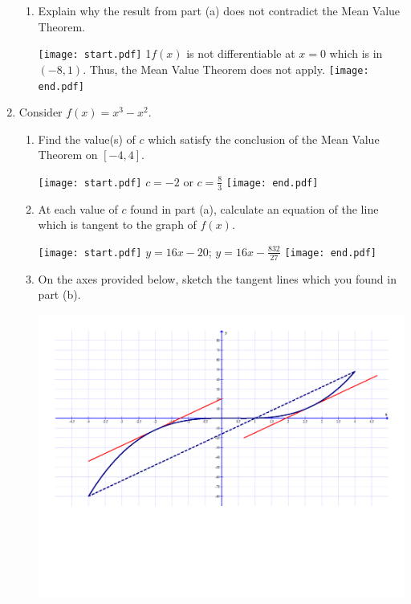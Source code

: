\documentclass[12pt]{article}
\begin{document}
\begin{enumerate}
\begin{enumerate}
\item Explain why the result from part (a) does not contradict the Mean Value Theorem.

\texttt{[image: start.pdf]}
{{{1\linewidth}{$f(x)$ is not differentiable at $x=0$ which is in $(-8,1)$.  Thus, the Mean Value Theorem does not apply.}}}
\texttt{[image: end.pdf]}


\end{enumerate}

\newpage

\item Consider $f(x)=x^3-x^2$.

\begin{enumerate}

\item Find the value(s) of $c$ which satisfy the conclusion of the Mean Value Theorem on $[-4,4]$.

\texttt{[image: start.pdf]}
{{$c=-2$ or $c=\frac{8}{3}$}}
\texttt{[image: end.pdf]}


\item At each value of $c$ found in part (a), calculate an equation of the line which is tangent to the graph of $f(x)$.

\texttt{[image: start.pdf]}
{{$y=16x-20$; $y=16x-\frac{832}{27}$}}
\texttt{[image: end.pdf]}


\item On the axes provided below, sketch the tangent lines which you found in part (b).

\begin{center}
\includegraphics[scale=0.4]{grapha.pdf}
\end{center}


\end{enumerate}
\end{enumerate}
\end{document}
